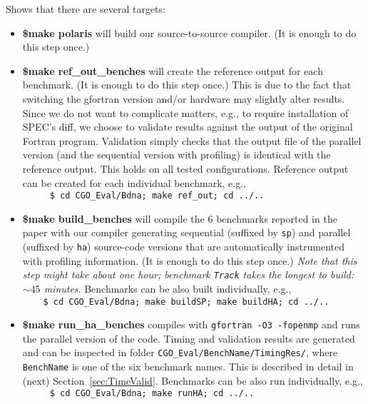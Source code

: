\documentclass{sig-alternate}
\begin{document}
Shows that there are several targets:
\begin{itemize}
    \item {\bf \$make polaris} will build our source-to-source compiler.
          (It is enough to do this step once.)

    \item {\bf \$make ref\_out\_benches} will create the reference output for each benchmark.
          (It is enough to do this step once.)
          This is due to the fact that switching the gfortran version and/or hardware
            may slightly alter results. Since we do not want to complicate matters,
            e.g., to require installation of SPEC's diff, we choose to validate
            results against the output of the original Fortran program.
          Validation simply checks that the output file of the parallel version
            (and the sequential version with profiling) is identical with
            the reference output. This holds on all tested configurations.
          Reference output can be created for each individual benchmark, e.g.,\\
            $\mbox{ }${\tt~~~~\$ cd CGO\_Eval/Bdna; make ref\_out; cd ../..}

    \item {\bf \$make build\_benches} will compile the $6$ benchmarks reported in the paper
            with our compiler generating sequential (suffixed by {\tt sp}) and 
            parallel (suffixed by {\tt ha}) source-code versions that are automatically 
            instrumented with profiling information.
            (It is enough to do this step once.) 
            {\em Note that this step might take about one hour; benchmark 
            {\tt Track} takes the longest to build: $\sim 45$ minutes}.
          Benchmarks can be also built individually, e.g.,\\
             {\tt~~~~\$ cd CGO\_Eval/Bdna; make buildSP; make buildHA; cd ../..}

    \item {\bf \$make run\_ha\_benches} compiles with {\tt gfortran -O3 -fopenmp} and 
            runs the parallel version of the code. Timing and validation results
            are generated and can be inspected in folder  
            {\tt CGO\_Eval/BenchName/TimingRes/}, where {\tt BenchName} is one of the
            six benchmark names. This is described in detail in (next) Section~\ref{sec:TimeValid}.
          Benchmarks can be also run individually, e.g.,\\
             $\mbox{ }${\tt~~~~\$ cd CGO\_Eval/Bdna; make runHA; cd ../..}


\end{itemize}
\end{document}
